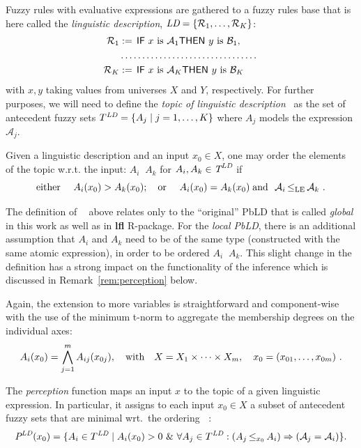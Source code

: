 \documentclass[review]{elsarticle}
\newcommand{\pkg}[1]{\textbf{#1}}
\newcommand{\proglang}[1]{#1}
\newcommand{\T}{\text{\it T}}
\newcommand{\LD}{\text{\it LD}}
\newcommand{\LPerc}{\text{\it P}}
\newcommand{\lingterm}[1]{\text{\sf #1}}
\newcommand{\defeq}{\mathrel{:=}\,}
\newcommand{\LpredC}[2]{#1\text{ is }#2}
\newcommand{\IFRule}[4]{\lingterm{IF } \LpredC{#1}{#2}
\lingterm{ THEN } \LpredC{#3}{#4}}
\def\llp{\mathop{\le_{x_0} }\nolimits}
\def\lle{\mathop{\le_{\rm LE} }\nolimits}
\def\lle{\mathop{\le_{\rm LE} }\nolimits}
\begin{document}
Fuzzy rules with evaluative expressions are gathered to a fuzzy rules base that is here called the \emph{linguistic description}, $\LD=
\{\mathcal{R}_1, \ldots, \mathcal{R}_K\}$:
\begin{align}
\mathcal{R}_1&\defeq\IFRule{x}{\mathcal{A}_1}{y}{\mathcal{B}_1},\notag\\
&\makebox[50mm]{\dotfill}\label{form.lingdesc}\\
\mathcal{R}_K&\defeq\IFRule{x}{\mathcal{A}_K}{y}{\mathcal{B}_K}\notag 
\end{align}
with $x,y$ taking values from universes $X$ and $Y$, respectively. For further purposes, we will need to define the \emph{topic of linguistic description }\LD\ as the set of antecedent fuzzy sets
$T^{\LD} =\{ A_j \mid j=1, \ldots, K\}$ where $A_j$ models the expression $\mathcal{A}_j$.






Given a linguistic description and an input $x_0\in X$, one may order the elements of the topic w.r.t. the input: $ A_{i} \llp A_{k}$ for $A_i,A_k\in \T^{\LD}$ if 
\begin{equation*}
\mbox{either } \quad  A_{i}(x_0)> A_{k}(x_0); 
\quad \mbox{or }\quad A_{i}(x_0) = A_{k}(x_0) \; \mbox{and }\
\mathcal{A}_i\lle \mathcal{A}_k  \ .
\end{equation*}

The definition of $\llp$ above relates only to the ``original'' PbLD that is called \emph{global} in this work as well as in \pkg{lfl} \proglang{R}-package. For the \emph{local PbLD}, there is an additional assumption that $A_{i}$ and $A_{k}$ need to be of the same type (constructed with the same atomic expression), in order to be ordered $A_{i} \llp A_{k}$. This slight change in the definition has a strong impact on the functionality of the inference \citep{DvoStep:PbLD2015} which is discussed in Remark~\ref{rem:perception} below.


Again, the extension to more variables is straightforward and component-wise with the use of the minimum t-norm to aggregate the membership degrees on the individual axes:
\begin{equation*}\label{form:compExtens}
A_i(x_0) =\bigwedge_{j=1}^m A_{ij}(x_{0j}), \quad \mbox{\rm with}\quad X = X_1\times \cdots
\times X_m , \quad x_0 =  (x_{01}, \dots, x_{0m})\ .
\end{equation*}



The \emph{perception} function maps an input $x$ to the topic of a given linguistic expression. In particular, it assigns to each input  $x_0\in X$ a
subset of antecedent fuzzy sets that are minimal wrt.~the ordering
$\llp$:
\begin{multline*}\label{eq.lperc}
\LPerc^{\LD}(x_0) =  \{ A_i \in T^{\LD}\mid A_i(x_0)>0 \ \&\
\forall A_j\in T^{\LD}: (A_j\llp A_i) \Rightarrow (\mathcal{A}_j =
\mathcal{A}_i) \}.
\end{multline*}
\end{document}
